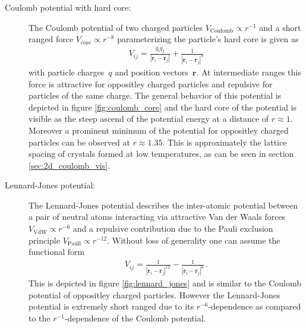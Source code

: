\documentclass[11pt, a4paper]{article}
\numberwithin{equation}{section}
\begin{document}
\begin{description}
	\item[Coulomb potential with hard core:]
		The Coulomb potential of two charged particles $V_\mathrm{Coulomb} \propto r^{-1}$ and a short ranged force $V_\mathrm{core} \propto r^{-8}$ parameterizing the particle's hard core  is given as
		\begin{align*}
			V_{ij} = \frac{q_i q_j}{| \mathbf{r}_i - \mathbf{r}_j |} + \frac{1}{| \mathbf{r}_i - \mathbf{r}_j |^8}
		\end{align*}
		with particle charges~$q$ and position vectors~$\mathbf{r}$.
		At intermediate ranges this force is attractive for oppositley charged particles and repulsive for particles of the same charge.
		The general behavior of this potential is depicted in figure \ref{fig:coulomb_core} and the hard core of the potential is visible as the steep ascend of the potential energy at a distance of $r \approx 1$.
		Moreover a prominent minimum of the potential for oppositley charged particles can be observed at $r \approx 1.35$.
		This is approximately the lattice spacing of crystals formed at low temperatures, as can be seen in section \ref{sec:2d_coulomb_vis}.
		
	\item[Lennard-Jones potential:]
		The Lennard-Jones potential describes the inter-atomic potential between a pair of neutral atoms interacting via attractive Van der Waals forces $V_\mathrm{VdW} \propto r^{-6}$ and a repulsive contribution due to the Pauli exclusion principle $V_\mathrm{Pauli} \propto r^{-12}$.
		Without loss of generality one can assume the functional form
		\begin{align*}
			V_{ij} = \frac{1}{| \mathbf{r}_i - \mathbf{r}_j |^{12}} - \frac{1}{| \mathbf{r}_i - \mathbf{r}_j |^6} \, \text{.}
		\end{align*}
		This is depicted in figure \ref{fig:lennard_jones} and is similar to the Coulomb potential of oppositley charged particles.
		However the Lennard-Jones potential is extremely short ranged due to its $r^{-6}$-dependence as compared to the $r^{-1}$-dependence of the Coulomb potential.
	
\end{description}
\end{document}
